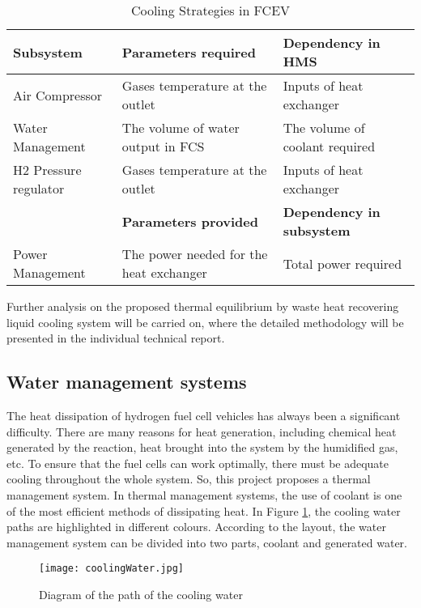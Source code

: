 \documentclass[a4paper,11pt]{article}
\begin{document}
\begin{table}[h!]
    \centering
    \begin{tabular}{|l|l|l|}%
    \hline
    \textbf{Subsystem} & \textbf{Parameters required} & \textbf{Dependency in HMS} \\ [0.5ex] 
    \hline\hline
    Air Compressor & Gases temperature at the outlet & Inputs of heat exchanger \\
    \hline
    Water Management & The volume of water output in FCS & The volume of coolant required \\
    \hline
    H2 Pressure regulator & Gases temperature at the outlet & Inputs of heat exchanger \\
    \hline
    & \textbf{Parameters provided} & \textbf{Dependency in subsystem} \\
    \hline
    Power Management & The power needed for the heat exchanger & Total power required \\
    \hline
    \end{tabular}
    \caption{Cooling Strategies in FCEV}
    \label{tab:subsystemDependencies}
\end{table}

Further analysis on the proposed thermal equilibrium by waste heat recovering liquid cooling system will be carried on, where the detailed methodology will be presented in the individual technical report.

\subsection{Water management systems}

The heat dissipation of hydrogen fuel cell vehicles has always been a significant difficulty. There are many reasons for heat generation, including chemical heat generated by the reaction, heat brought into the system by the humidified gas, etc. To ensure that the fuel cells can work optimally, there must be adequate cooling throughout the whole system. So, this project proposes a thermal management system. In thermal management systems, the use of coolant is one of the most efficient methods of dissipating heat. In Figure \ref{fig:coolingWater}, the cooling water paths are highlighted in different colours. According to the layout, the water management system can be divided into two parts, coolant and generated water.

\begin{figure}[h]
    \texttt{[image: coolingWater.jpg]}
    \caption{Diagram of the path of the cooling water}
    \centering
    \label{fig:coolingWater}  
\end{figure}
\end{document}
